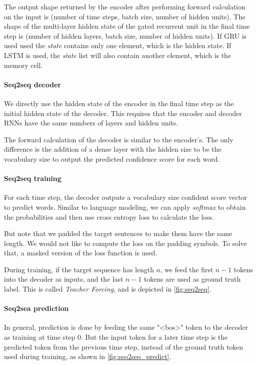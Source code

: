 The output shape returned by the encoder after performing forward calculation on the input is (number of time steps, batch size, number of hidden units). The shape of the multi-layer hidden state of the gated recurrent unit in the final time step is (number of hidden layers, batch size, number of hidden units). If GRU is used used the \textit{state}  contains only one element, which is the hidden state. If LSTM is used, the \textit{state} list will also contain another element, which is the memory cell.

\paragraph{Seq2seq decoder}
We directly use the hidden state of the encoder in the final time step as the initial hidden state of the decoder. This requires that the encoder and decoder RNNs have the same numbers of layers and hidden units.

The forward calculation of the decoder is similar to the encoder's. The only difference is the addition of a dense layer with the hidden size to be the vocabulary size to output the predicted confidence score for each word.

\paragraph{Seq2seq training}

For each time step, the decoder outputs a vocabulary size confident score vector to predict words. Similar to language modeling, we can apply \textit{softmax} to obtain the probabilities and then use cross entropy loss to calculate the loss. 

But note that we padded the target sentences to make them have the same length. We would not like to compute the loss on the padding symbols. To solve that, a masked version of the loss function is used.

During training, if the target sequence has length $n$, we feed the first $n-1$ tokens into the decoder as inputs, and the last $n-1$ tokens are used as ground truth label. This is called \textit{Teacher Forcing}, and is depicted in \cref{fig:seq2seq}.

\paragraph{Seq2sea prediction}

In general, prediction is done by feeding the same "<bos>" token to the decoder as training at time step 0. But the input token for a later time step is the predicted token from the previous time step, instead of the ground truth token used during training, as shown in \cref{fig:seq2seq_predict}.

